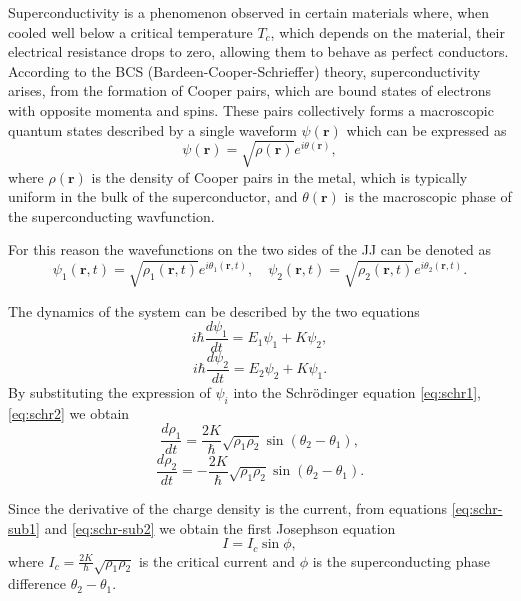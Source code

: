 Superconductivity is a phenomenon observed in certain materials where, when cooled well below a critical temperature $T_c$, which depends on the material, their electrical resistance drops to zero, allowing them to behave as perfect conductors.
According to the BCS (Bardeen-Cooper-Schrieffer) theory, superconductivity arises, from the formation of Cooper pairs, which are bound states of electrons with opposite momenta and spins.
These pairs collectively forms a macroscopic quantum states described by a single waveform $\psi(\mathbf{r})$ which can be expressed as 
\begin{equation}\label{eq:BCSequation}
    \psi(\mathbf{r}) = \sqrt{\rho(\mathbf{r})}e^{i\theta(\mathbf{r})},
\end{equation}
where $\rho(\mathbf{r})$ is the density of Cooper pairs in the metal, which is typically uniform in the bulk of the superconductor, and $\theta(\mathbf{r})$ is the macroscopic phase of the superconducting wavfunction.

For this reason the wavefunctions on the two sides of the JJ can be denoted as
\begin{equation}\label{eq:JosephsonWavefunctions}
    \psi_1(\mathbf{r}, t) = \sqrt{\rho_1(\mathbf{r}, t)} e^{i\theta_1(\mathbf{r},t)}, \quad \psi_2(\mathbf{r}, t) = \sqrt{\rho_2(\mathbf{r}, t)} e^{i\theta_2(\mathbf{r},t)}.
\end{equation}

The dynamics of the system can be described by the two equations\begin{equation}\label{eq:schr1}
    i\hbar \frac{d\psi_1}{dt} = E_1 \psi_1 + K \psi_2,
\end{equation}
\begin{equation}\label{eq:schr2}
    i\hbar \frac{d\psi_2}{dt} = E_2 \psi_2 + K \psi_1.
\end{equation}
By substituting the expression of $\psi_i$ into the Schr\"odinger equation \ref{eq:schr1}, \ref{eq:schr2} we obtain
\begin{equation}\label{eq:schr-sub1}
    \frac{d\rho_1}{dt} = \frac{2K}{\hbar} \sqrt{\rho_1 \rho_2} \sin(\theta_2 - \theta_1),
\end{equation}
\begin{equation}\label{eq:schr-sub2}
    \frac{d\rho_2}{dt} = -\frac{2K}{\hbar} \sqrt{\rho_1 \rho_2} \sin(\theta_2 - \theta_1).
\end{equation}

Since the derivative of the charge density is the current, from equations \ref{eq:schr-sub1} and \ref{eq:schr-sub2} we obtain the first Josephson equation
\begin{equation}\label{eq:Josephson1}
    I=I_c\sin{\phi},
\end{equation} 
where $I_c = \frac{2K}{\hbar}\sqrt{\rho_1\rho_2}$ is the critical current and $\phi$ is the superconducting phase difference $\theta_2 - \theta_1$.


